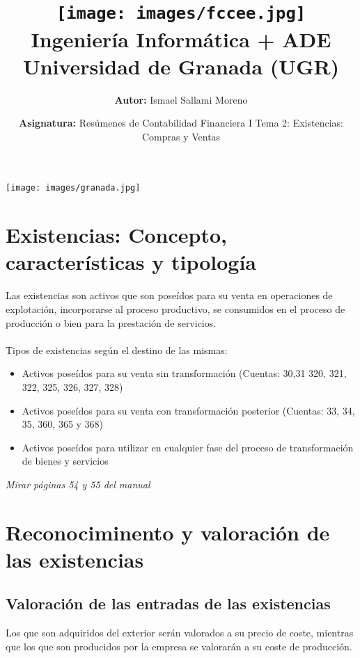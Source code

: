 \documentclass[a4paper,12pt]{article}
\title{
    \vspace{-2cm}
    \texttt{[image: images/fccee.jpg]} \\ %
    \LARGE Ingeniería Informática + ADE\\
    \large Universidad de Granada (UGR)\\[1cm]
}
\author{\textbf{Autor:} Ismael Sallami Moreno}
\date{\textbf{Asignatura:} Resúmenes de Contabilidad Financiera I Tema 2: Existencias: Compras y Ventas}
\begin{document}
\maketitle
\thispagestyle{empty}

\begin{center}
    \texttt{[image: images/granada.jpg]} \\ %
    \vfill
\end{center}

\newpage

\tableofcontents
\newpage





\section{Existencias: Concepto, características y tipología}

Las existencias son activos que son poseídos para su venta en operaciones de explotación, incorporarse al proceso productivo, se consumidos en el proceso de producción o bien para la prestación de servicios.\\\\
Tipos de existencias según el destino de las mismas:
\begin{itemize}
    \item Activos poseídos para su venta sin transformación (Cuentas: 30,31 320, 321, 322, 325, 326, 327, 328)
    \item Activos poseídos para su venta con transformación posterior (Cuentas: 33, 34, 35, 360, 365 y 368)
    \item Activos poseídos para utilizar en cualquier fase del proceso de transformación de bienes y servicios
\end{itemize}
\textit{Mirar páginas 54 y 55 del manual}

\section{Reconociminento y valoración de las existencias}

\subsection{Valoración de las entradas de las existencias}

Los que son adquiridos del exterior serán valorados a su precio de coste, mientras que los que son producidos por la empresa se valorarán a su coste de producción.
\end{document}
